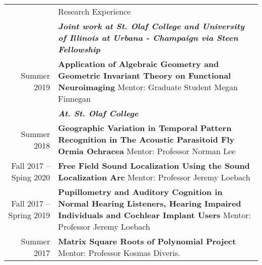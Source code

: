 \documentclass[letterpaper, 11pt]{article}
\newcommand{\headingfont}{\Large\color{Red}}
\newenvironment{SectionTable}[1]{
	\renewcommand*{\arraystretch}{1.7}
	\setlength{\tabcolsep}{10pt}
	\begin{longtable}{Rp{5.2in}} & #1 \\}
	{\end{longtable}\vspace{-.3cm}}
\begin{document}
	\begin{SectionTable}{\headingfont Research Experience}
		
		& \textit{\textbf{Joint work at St. Olaf College and University of Illinois at Urbana - Champaign via Steen Fellowship}}\\
		Summer 2019 &
		\textbf{Application of Algebraic Geometry and Geometric Invariant Theory on Functional Neuroimaging} \newline
		Mentor:  Graduate Student Megan Finnegan \\
		\newpage
		& \textit{\textbf{At. St. Olaf College}} \\
		Summer 2018 &
		\textbf{Geographic Variation in Temporal Pattern Recognition in The Acoustic Parasitoid Fly Ormia Ochracea} \newline
		Mentor:  Professor Norman Lee \\
		Fall 2017 -- Sping 2020 &
		\textbf{Free Field Sound Localization Using the Sound Localization Arc} \newline
		Mentor:  Professor Jeremy Loebach \\
		Fall 2017 -- Spring 2019  &
		\textbf{Pupillometry and Auditory Cognition in Normal Hearing Listeners, Hearing Impaired Individuals and Cochlear Implant Users} \newline
		Mentor: Professor Jeremy Loebach \\

		Summer 2017  &
		\textbf{Matrix Square Roots of Polynomial Project} \newline
		Mentor: Professor Kosmas Diveris. \\
	\end{SectionTable}
	
\end{document}
